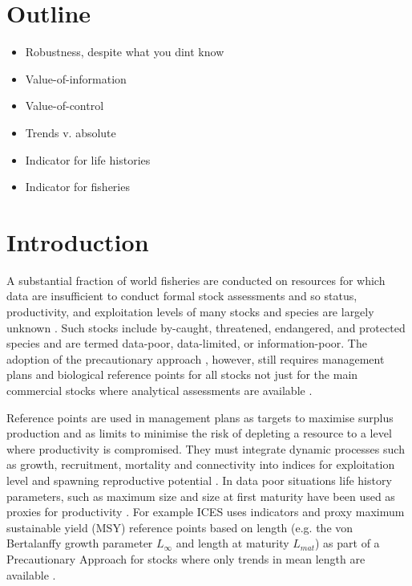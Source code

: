 \documentclass[12pt,doublespacing,a4paper]{ouparticle}
\begin{document}
\newpage


\linenumbers
\linespread{2}

\section{Outline}
\begin{itemize}
 \item Robustness, despite what you dint know
 \item Value-of-information
 \item Value-of-control
 \item Trends v. absolute
 \item Indicator for life histories
 \item Indicator for fisheries
\end{itemize}


\section{Introduction}

A substantial fraction of world fisheries are conducted on resources for which data are insufficient to conduct formal stock assessments and so status, productivity, and exploitation levels of many stocks and species are largely unknown \citep{thorson2015introduction}. Such stocks include by-caught, threatened, endangered, and protected species and are termed data-poor, data-limited, or information-poor. The adoption of the precautionary approach \citep[PA,][]{garcia1996precautionary}, however, still requires management plans and biological reference points for all stocks not just for the main commercial stocks where analytical assessments are available \citep{sainsbury2003ref}. 

Reference points are used in management plans as targets to maximise surplus production and as limits to minimise the risk of depleting a resource to a level where productivity is compromised. They must integrate dynamic processes such as growth, recruitment, mortality and connectivity into indices for exploitation level and spawning reproductive potential \citep{kell2015spawning}. In data poor situations life history parameters, such as maximum size and size at first maturity have been used as proxies for productivity \citep{roff1984evolution,jensen1996beverton,caddy1998short,reynolds2001life,denney2002life}. For example ICES uses indicators and proxy maximum sustainable yield (MSY) reference points based on length (e.g. the von Bertalanffy growth parameter $L_{\infty}$ and length at maturity $L_{mat}$) as part of a Precautionary Approach for stocks where only trends in mean length are available \citep[][]{ref}. 
\end{document}
